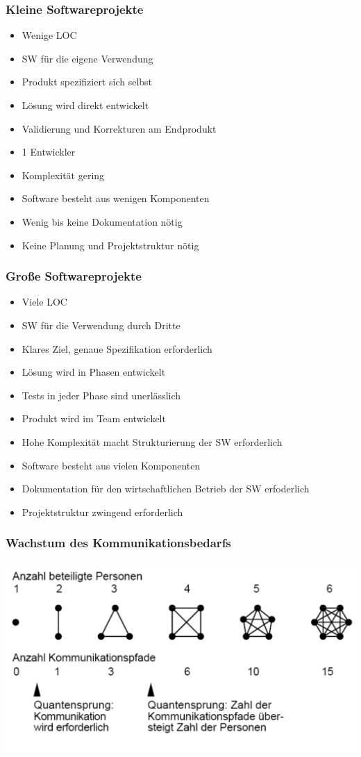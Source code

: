 \begin{frame}
\frametitle{Kleine Softwareprojekte}
	\begin{itemize}
		\item Wenige LOC
		\item SW für die eigene Verwendung
		\item Produkt spezifiziert sich selbst
		\item Lösung wird direkt entwickelt
		\item Validierung und Korrekturen am Endprodukt
		\item 1 Entwickler
		\item Komplexität gering
		\item Software besteht aus wenigen Komponenten
		\item Wenig bis keine Dokumentation nötig
		\item Keine Planung und Projektstruktur nötig
	\end{itemize}
\end{frame}

\begin{frame}
\frametitle{Große Softwareprojekte}
	\begin{itemize}
		\item Viele LOC
		\item SW für die Verwendung durch Dritte
		\item Klares Ziel, genaue Spezifikation erforderlich
		\item Lösung wird in Phasen entwickelt
		\item Tests in jeder Phase sind unerlässlich
		\item Produkt wird im Team entwickelt
		\item Hohe Komplexität macht Strukturierung der SW erforderlich
		\item Software besteht aus vielen Komponenten
		\item Dokumentation für den wirtschaftlichen Betrieb der SW erfoderlich
		\item Projektstruktur zwingend erforderlich
	\end{itemize}
\end{frame}

\begin{frame}
\frametitle{Wachstum des Kommunikationsbedarfs}
	\center\includegraphics[width=1\textwidth,
	keepaspectratio=true]{bilder/kommunikationsbedarf.png}
\end{frame}

